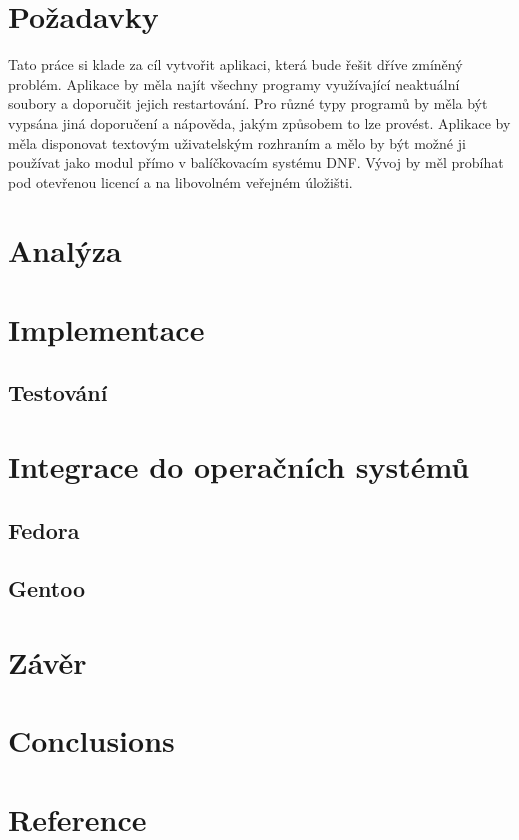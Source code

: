 \documentclass[10pt,a4paper]{article}
\begin{document}
	\section{Požadavky}
	Tato práce si klade za cíl vytvořit aplikaci, která bude řešit dříve zmíněný problém. Aplikace by měla najít všechny programy využívající neaktuální soubory a doporučit jejich restartování. Pro různé typy programů by měla být vypsána jiná doporučení a nápověda, jakým způsobem to lze provést. Aplikace by měla disponovat textovým uživatelským rozhraním a mělo by být možné ji používat jako modul přímo v balíčkovacím systému DNF. Vývoj by měl probíhat pod otevřenou licencí a na libovolném veřejném úložišti.
	
	\section{Analýza}
	\section{Implementace}
		\subsection{Testování}

	\section{Integrace do operačních systémů}
		\subsection{Fedora}
		\subsection{Gentoo}
		
	\section{Závěr} %
	\section{Conclusions} %
	\section{Reference} %
	
\end{document}
